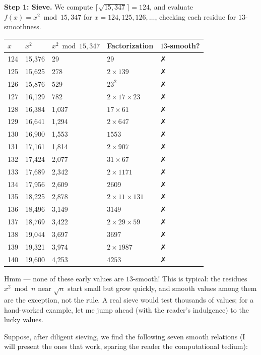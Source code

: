 \textbf{Step 1: Sieve.} We compute $\lceil \sqrt{15{,}347} \rceil = 124$, and evaluate $f(x) = x^2 \bmod 15{,}347$ for $x = 124, 125, 126, \ldots$, checking each residue for $13$-smoothness.


\begin{center}
\begin{tabular}{lllll}
\toprule
$x$ & $x^2$ & $x^2 \bmod 15{,}347$ & Factorization & $13$-smooth? \\
\midrule
124 & 15,376 & 29 & $29$ & ✗ \\
125 & 15,625 & 278 & $2 \times 139$ & ✗ \\
126 & 15,876 & 529 & $23^2$ & ✗ \\
127 & 16,129 & 782 & $2 \times 17 \times 23$ & ✗ \\
128 & 16,384 & 1,037 & $17 \times 61$ & ✗ \\
129 & 16,641 & 1,294 & $2 \times 647$ & ✗ \\
130 & 16,900 & 1,553 & $1553$ & ✗ \\
131 & 17,161 & 1,814 & $2 \times 907$ & ✗ \\
132 & 17,424 & 2,077 & $31 \times 67$ & ✗ \\
133 & 17,689 & 2,342 & $2 \times 1171$ & ✗ \\
134 & 17,956 & 2,609 & $2609$ & ✗ \\
135 & 18,225 & 2,878 & $2 \times 11 \times 131$ & ✗ \\
136 & 18,496 & 3,149 & $3149$ & ✗ \\
137 & 18,769 & 3,422 & $2 \times 29 \times 59$ & ✗ \\
138 & 19,044 & 3,697 & $3697$ & ✗ \\
139 & 19,321 & 3,974 & $2 \times 1987$ & ✗ \\
140 & 19,600 & 4,253 & $4253$ & ✗ \\
\bottomrule
\end{tabular}
\end{center}


Hmm --- none of these early values are $13$-smooth! This is typical: the residues $x^2 \bmod n$ near $\sqrt{n}$ start small but grow quickly, and smooth values among them are the exception, not the rule. A real sieve would test thousands of values; for a hand-worked example, let me jump ahead (with the reader's indulgence) to the lucky values.

Suppose, after diligent sieving, we find the following seven smooth relations (I will present the ones that work, sparing the reader the computational tedium):


